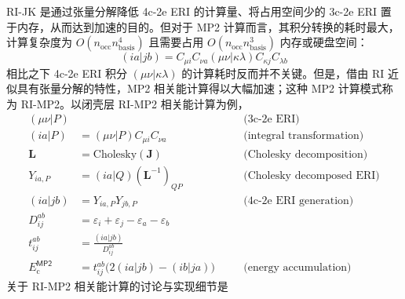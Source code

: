 RI-JK 是通过张量分解降低 4c-2e ERI 的计算量、将占用空间少的 3c-2e ERI 置于内存，从而达到加速的目的。但对于 MP2 计算而言，其积分转换的耗时最大，计算复杂度为 $O(n_\mathrm{occ} n_\mathrm{basis}^4)$ 且需要占用 $O(n_\mathrm{occ} n_\mathrm{basis}^3)$ 内存或硬盘空间：
\begin{equation}
  (ia|jb) = C_{\mu i} C_{\nu a} (\mu \nu | \kappa \lambda) C_{\kappa j} C_{\lambda b}
\end{equation}
相比之下 4c-2e ERI 积分 $(\mu \nu | \kappa \lambda)$ 的计算耗时反而并不关键。但是，借由 RI 近似具有张量分解的特性，MP2 相关能计算得以大幅加速；这种 MP2 计算模式称为 RI-MP2\cite{Feyereisen-Komornicki.CPL.1993, 10.1016/S0009-2614(98)00862-8}。以闭壳层 RI-MP2 相关能计算为例，
\begin{subequations}
\label{eqs.ri-mp2-ecorr}
\begin{alignat}{10}
  (\mu \nu | P) & && \quad \text{(3c-2e ERI)} \\
  (ia|P) &= (\mu \nu | P) C_{\mu i} C_{\nu a} && \quad \text{(integral transformation)} \\
  \mathbf{L} &= \mathrm{Cholesky} (\mathbf{J}) && \quad \text{(Cholesky decomposition)} \\
  Y_{ia, P} &= (ia|Q) (\mathbf{L}^{-1})_{QP} && \quad \text{(Cholesky decomposed ERI)} \\
  (ia|jb) &= Y_{ia, P} Y_{jb, P} && \quad \text{(4c-2e ERI generation)} \\
  \label{eq.def.D-ijab}
  D_{ij}^{ab} &= \varepsilon_i + \varepsilon_j - \varepsilon_a - \varepsilon_b \\
  t_{ij}^{ab} &= \frac{(ia|jb)}{D_{ij}^{ab}} \\
  E_\mathrm{c}^\textsf{MP2} &= t_{ij}^{ab} \big(2 (ia|jb) - (ib|ja) \big) && \quad \text{(energy accumulation)}
\end{alignat}
\end{subequations}
关于 RI-MP2 相关能计算的讨论与实现细节是
